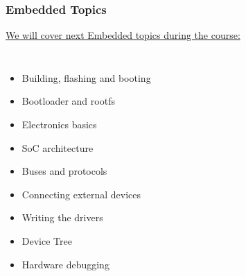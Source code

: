 \documentclass[aspectratio=169]{beamer}
\begin{document}
\begin{frame}
  \frametitle{Embedded Topics}
  \underline{We will cover next Embedded topics during the course:}
  \begin{columns}
      \begin{itemize}
        \item<1-> Building, flashing and booting
        \item<2-> Bootloader and rootfs
        \item<3-> Electronics basics
        \item<4-> SoC architecture
        \item<5-> Buses and protocols
        \item<6-> Connecting external devices
        \item<7-> Writing the drivers
        \item<8-> Device Tree
        \item<9-> Hardware debugging
      \end{itemize}

\end{columns}
\end{frame}
\end{document}
